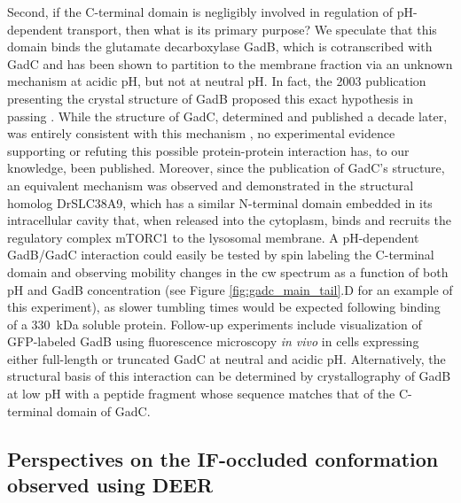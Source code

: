 Second, if the C-terminal domain is negligibly involved in regulation of pH-dependent transport, then what is its primary purpose? We speculate that this domain binds the glutamate decarboxylase GadB, which is cotranscribed with GadC and has been shown to partition to the membrane fraction via an unknown mechanism at acidic pH, but not at neutral pH. In fact, the 2003 publication presenting the crystal structure of GadB proposed this exact hypothesis in passing \citep*{Capitani2003}. While the structure of GadC, determined and published a decade later, was entirely consistent with this mechanism \citep*{Ma2012}, no experimental evidence supporting or refuting this possible protein-protein interaction has, to our knowledge, been published. Moreover, since the publication of GadC's structure, an equivalent mechanism was observed and demonstrated in the structural homolog DrSLC38A9, which has a similar N-terminal domain embedded in its intracellular cavity that, when released into the cytoplasm, binds and recruits the regulatory complex mTORC1 to the lysosomal membrane. A pH-dependent GadB/GadC interaction could easily be tested by spin labeling the C-terminal domain and observing mobility changes in the \gls{cw} spectrum as a function of both pH and GadB concentration (see Figure \ref{fig:gadc_main_tail}.D for an example of this experiment), as slower tumbling times would be expected following binding of a \SI{330}{kDa} soluble protein. Follow-up experiments include visualization of GFP-labeled GadB using fluorescence microscopy \emph{in vivo} in cells expressing either full-length or truncated GadC at neutral and acidic pH. Alternatively, the structural basis of this interaction can be determined by crystallography of GadB at low pH with a peptide fragment whose sequence matches that of the C-terminal domain of GadC.

\subsection{Perspectives on the IF-occluded conformation observed using DEER}

